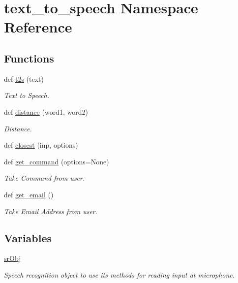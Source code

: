 \hypertarget{namespacetext__to__speech}{}\section{text\+\_\+to\+\_\+speech Namespace Reference}
\label{namespacetext__to__speech}
\subsection*{Functions}
\begin{DoxyCompactItemize}
\item 
def \hyperlink{namespacetext__to__speech_a81e6ef88fc37db1c4c854a4ad56211f4}{t2s} (text)
\begin{DoxyCompactList}\small\item\em Text to Speech. \end{DoxyCompactList}\item 
def \hyperlink{namespacetext__to__speech_abceebbe83c4f615b44aecc2bb60f70a8}{distance} (word1, word2)
\begin{DoxyCompactList}\small\item\em Distance. \end{DoxyCompactList}\item 
def \hyperlink{namespacetext__to__speech_a0e407efcc2883969a8a104e127349e45}{closest} (inp, options)
\item 
def \hyperlink{namespacetext__to__speech_a3a7cf819f172e2192993dd87a4662a80}{get\+\_\+command} (options=None)
\begin{DoxyCompactList}\small\item\em Take Command from user. \end{DoxyCompactList}\item 
def \hyperlink{namespacetext__to__speech_a12a2387847caabce244fa055014b2df2}{get\+\_\+email} ()
\begin{DoxyCompactList}\small\item\em Take Email Address from user. \end{DoxyCompactList}\end{DoxyCompactItemize}
\subsection*{Variables}
\begin{DoxyCompactItemize}
\item 
\hyperlink{namespacetext__to__speech_aa2ceb201cb1da42ee4cf35154081d8ae}{sr\+Obj}
\begin{DoxyCompactList}\small\item\em Speech recognition object to use its methods for reading input at microphone. \end{DoxyCompactList}\end{DoxyCompactItemize}


